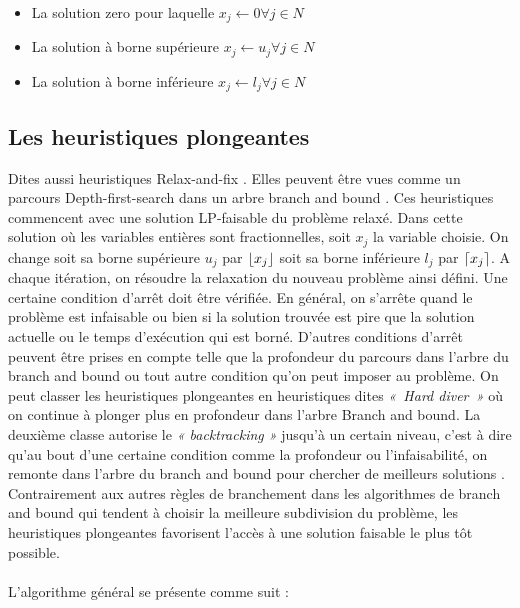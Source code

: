 \documentclass[12pt,a4paper,oneside]{book}
\theoremstyle{definition}
\DeclarePairedDelimiter\ceil{\lceil}{\rceil}
\DeclarePairedDelimiter\floor{\lfloor}{\rfloor}
\begin{document}
	\begin{itemize}
		\item La solution zero pour laquelle $x_j \gets 0 \forall j \in N$
		\item La solution à borne supérieure $x_j \gets u_j \forall j \in N $
		\item La solution à borne inférieure $x_j \gets l_j \forall j \in N $
	\end{itemize}
	\subsection{Les heuristiques plongeantes}
	Dites aussi heuristiques Relax-and-fix \cite{fischetti2010heuristics}. Elles peuvent être vues comme un parcours Depth-first-search dans un arbre branch and bound \cite{Bertholda}. Ces heuristiques commencent avec une solution LP-faisable du problème relaxé. Dans cette solution où les variables entières sont fractionnelles, soit $x_j$ la variable choisie. On change soit sa borne supérieure $u_j$ par $\floor{x_j}$ soit sa borne inférieure $l_j$ par $\ceil{x_j}$. A chaque itération, on résoudre la relaxation du nouveau problème ainsi défini. Une certaine condition d’arrêt doit être vérifiée. En général, on s’arrête quand le problème est infaisable ou bien si la solution trouvée est pire que la solution actuelle ou le temps d’exécution qui est borné. D’autres conditions d’arrêt peuvent être prises en compte telle que la profondeur du parcours dans l’arbre du branch and bound ou tout autre condition qu’on peut imposer au problème.
	On peut classer les heuristiques plongeantes en heuristiques dites \textit{« Hard diver »} où on continue à plonger plus en profondeur dans l'arbre Branch and bound. La deuxième classe autorise le \textit{« backtracking »} jusqu'à un certain niveau, c’est à dire qu’au bout d’une certaine condition comme la profondeur ou l’infaisabilité, on remonte dans l’arbre du branch and bound pour chercher de meilleurs solutions \cite{fischetti2010heuristics}. Contrairement aux autres règles de branchement dans les algorithmes de branch and bound qui tendent à choisir la meilleure subdivision du problème, les heuristiques plongeantes favorisent l’accès à une solution faisable le plus tôt possible.
	\paragraph{}
	L’algorithme général se présente comme suit :
	
\end{document}
